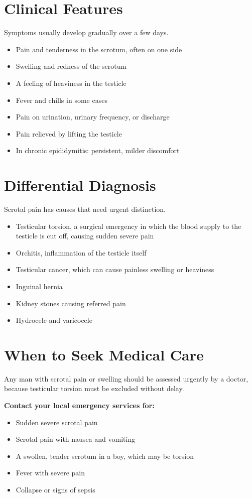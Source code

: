 \section*{Clinical Features}
Symptoms usually develop gradually over a few days.
\begin{itemize}
    \item Pain and tenderness in the scrotum, often on one side
    \item Swelling and redness of the scrotum
    \item A feeling of heaviness in the testicle
    \item Fever and chills in some cases
    \item Pain on urination, urinary frequency, or discharge
    \item Pain relieved by lifting the testicle
    \item In chronic epididymitis: persistent, milder discomfort
\end{itemize}

\section*{Differential Diagnosis}
Scrotal pain has causes that need urgent distinction.
\begin{itemize}
    \item Testicular torsion, a surgical emergency in which the blood supply to the testicle is cut off, causing sudden severe pain
    \item Orchitis, inflammation of the testicle itself
    \item Testicular cancer, which can cause painless swelling or heaviness
    \item Inguinal hernia
    \item Kidney stones causing referred pain
    \item Hydrocele and varicocele
\end{itemize}

\section*{When to Seek Medical Care}
Any man with scrotal pain or swelling should be assessed urgently by a doctor, because testicular torsion must be excluded without delay.

\textbf{Contact your local emergency services for:}
\begin{itemize}
    \item Sudden severe scrotal pain
    \item Scrotal pain with nausea and vomiting
    \item A swollen, tender scrotum in a boy, which may be torsion
    \item Fever with severe pain
    \item Collapse or signs of sepsis
\end{itemize}

